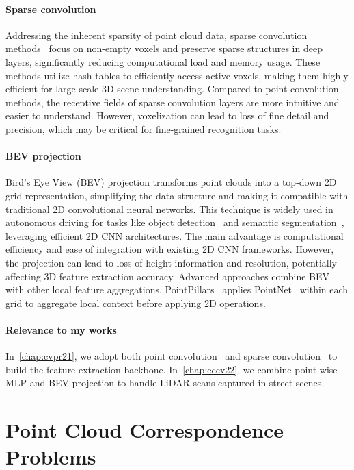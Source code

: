 \paragraph{Sparse convolution}
Addressing the inherent sparsity of point cloud data, sparse convolution methods~\cite{tang2022torchsparse,hackel2020inference,3DSemanticSegmentationWithSubmanifoldSparseConvNet} focus on non-empty voxels and preserve sparse structures in deep layers, significantly reducing computational load and memory usage. These methods utilize hash tables to efficiently access active voxels, making them highly efficient for large-scale 3D scene understanding. Compared to point convolution methods, the receptive fields of sparse convolution layers are more intuitive and easier to understand. However, voxelization can lead to loss of fine detail and precision, which may be critical for fine-grained recognition tasks.

\paragraph{BEV projection}
Bird's Eye View (BEV) projection transforms point clouds into a top-down 2D grid representation, simplifying the data structure and making it compatible with traditional 2D convolutional neural networks. This technique is widely used in autonomous driving for tasks like object detection~\cite{zhou2018voxelnet,lang2019pointpillars} and semantic segmentation~\cite{aksoy2020salsanet}, leveraging efficient 2D CNN architectures. The main advantage is computational efficiency and ease of integration with existing 2D CNN frameworks. However, the projection can lead to loss of height information and resolution, potentially affecting 3D feature extraction accuracy. Advanced approaches combine BEV with other local feature aggregations. PointPillars~\cite{lang2019pointpillars} applies PointNet~\cite{qi2017pointnet} within each grid to aggregate local context before applying 2D operations.

\paragraph{Relevance to my works} In~\cref{chap:cvpr21}, we adopt both point convolution~\cite{thomas2019kpconv} and sparse convolution~\cite{choy2019Minkowski} to build the feature extraction backbone. In~\cref{chap:eccv22}, we combine point-wise MLP and BEV projection to handle LiDAR scans captured in street scenes. 

\section{Point Cloud Correspondence Problems}
\label{sec:bg_problems}

